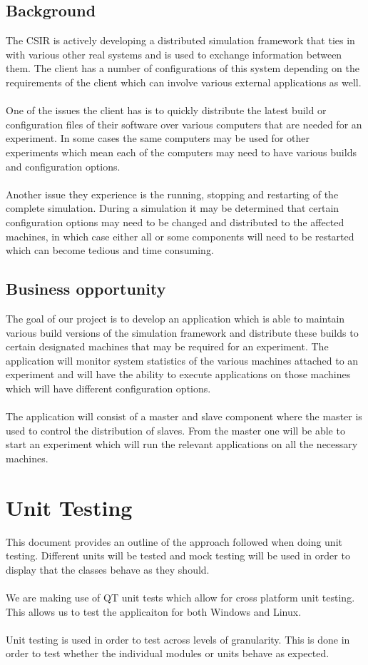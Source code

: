 \documentclass[a4paper,12pt,final]{article}
\begin{document}
\subsection{Background}
The CSIR is actively developing a distributed simulation framework that ties
in with various other real systems and is used to exchange information
between them. The client has a number of configurations of this system
depending on the requirements of the client which can involve various
external applications as well.\\
\textbf{\\}
One of the issues the client has is to quickly distribute the latest build or
configuration files of their software over various computers that are needed
for an experiment. In some cases the same computers may be used for other
experiments which mean each of the computers may need to have various
builds and configuration options.\\
\textbf{\\}
Another issue they experience is the running, stopping and restarting of
the complete simulation. During a simulation it may be determined that
certain configuration options may need to be changed and distributed to the
affected machines, in which case either all or some components will need to
be restarted which can become tedious and time consuming.
\subsection{Business opportunity}
The goal of our project is to develop an application which is able to maintain
various build versions of the simulation framework and distribute these builds
to certain designated machines that may be required for an experiment. The
application will monitor system statistics of the various machines attached
to an experiment and will have the ability to execute applications on those
machines which will have different configuration options.\\
\textbf{\\}
The application will consist of a master and slave component where the
master is used to control the distribution of slaves. From the master one will
be able to start an experiment which will run the relevant applications on all
the necessary machines.



\newpage
\section{Unit Testing}
This document provides an outline of the approach followed when doing unit testing. Different units will be tested and mock testing will be used in order to display that the classes behave as they should.\\
\textbf{\\}
We are making use of QT unit tests which allow for cross platform unit testing. This allows us to test the applicaiton for both Windows and Linux.\\
\textbf{\\}
Unit testing is used in order to test across levels of granularity. This is done in order to test whether the individual modules or units behave as expected.
\end{document}
